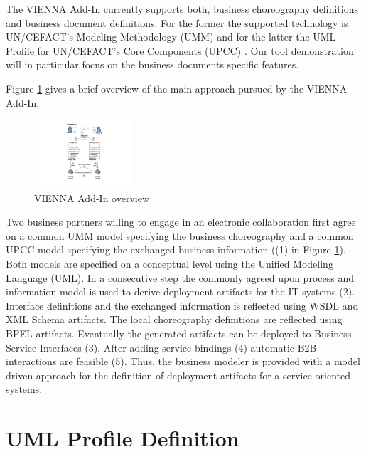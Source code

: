 \documentclass{acm_proc_article-sp}
\begin{document}
The VIENNA Add-In currently supports both, business choreography definitions and business document definitions. For the former the supported technology is UN/CEFACT's Modeling Methodology (UMM) \cite{man:umm2} and for the latter the UML Profile for UN/CEFACT's Core Components (UPCC) \cite{man:upcc}. Our tool demonstration will in particular focus on the business documents specific features. 

Figure \ref{fig:viennaaddinoverview} gives a brief overview of the main approach pursued by the VIENNA Add-In. 
\begin{figure}
 \centering
   \includegraphics[width=0.32\textwidth]{figures/addinoverview.pdf}
 \caption{VIENNA Add-In overview}
 \label{fig:viennaaddinoverview}
\end{figure}
Two business partners willing to engage in an electronic collaboration first agree on a common UMM model specifying the business choreography and a common UPCC model specifying the exchanged business information ((1) in Figure \ref{fig:viennaaddinoverview}). Both models are specified on a conceptual level using the Unified Modeling Language (UML). In a consecutive step the commonly agreed upon process and information model is used to derive deployment artifacts for the IT systems (2). Interface definitions and the exchanged information is reflected using WSDL and XML Schema artifacts. The local choreography definitions are reflected using BPEL artifacts. Eventually the generated artifacts can be deployed to Business Service Interfaces (3). After adding service bindings (4) automatic B2B interactions are feasible (5). Thus, the business modeler is provided with a model driven approach for the definition of deployment artifacts for a service oriented systems.


\section{UML Profile Definition}
\end{document}
